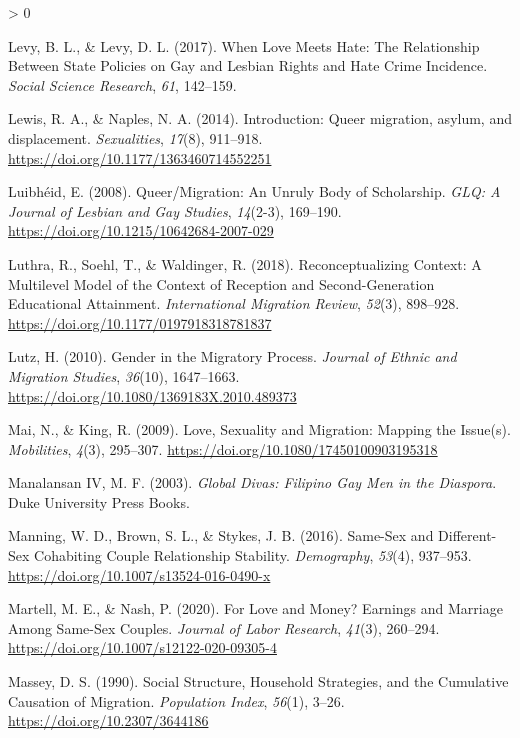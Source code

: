 \documentclass[
  12pt,
]{article}
\newlength{\cslhangindent}
\newenvironment{CSLReferences}[2] %
 {%
  \setlength{\parindent}{0pt}
  \ifodd #1 \everypar{\setlength{\hangindent}{\cslhangindent}}\ignorespaces\fi
  \ifnum #2 > 0
  \setlength{\parskip}{#2\baselineskip}
  \fi
 }%
 {}
\begin{document}
\begin{CSLReferences}{1}{0}
\leavevmode\hypertarget{ref-levy_2017}{}%
Levy, B. L., \& Levy, D. L. (2017). When {Love Meets Hate}: The {Relationship Between State Policies} on {Gay} and {Lesbian Rights} and {Hate Crime Incidence}. \emph{Social Science Research}, \emph{61}, 142--159.

\leavevmode\hypertarget{ref-lewis_2014}{}%
Lewis, R. A., \& Naples, N. A. (2014). Introduction: Queer migration, asylum, and displacement. \emph{Sexualities}, \emph{17}(8), 911--918. \url{https://doi.org/10.1177/1363460714552251}

\leavevmode\hypertarget{ref-luibheid_2008}{}%
Luibhéid, E. (2008). Queer/{Migration}: An {Unruly Body} of {Scholarship}. \emph{GLQ: A Journal of Lesbian and Gay Studies}, \emph{14}(2-3), 169--190. \url{https://doi.org/10.1215/10642684-2007-029}

\leavevmode\hypertarget{ref-luthra_2018}{}%
Luthra, R., Soehl, T., \& Waldinger, R. (2018). Reconceptualizing {Context}: A {Multilevel Model} of the {Context} of {Reception} and {Second}-{Generation Educational Attainment}. \emph{International Migration Review}, \emph{52}(3), 898--928. \url{https://doi.org/10.1177/0197918318781837}

\leavevmode\hypertarget{ref-lutz_2010}{}%
Lutz, H. (2010). Gender in the {Migratory Process}. \emph{Journal of Ethnic and Migration Studies}, \emph{36}(10), 1647--1663. \url{https://doi.org/10.1080/1369183X.2010.489373}

\leavevmode\hypertarget{ref-mai_2009}{}%
Mai, N., \& King, R. (2009). Love, {Sexuality} and {Migration}: Mapping the {Issue}(s). \emph{Mobilities}, \emph{4}(3), 295--307. \url{https://doi.org/10.1080/17450100903195318}

\leavevmode\hypertarget{ref-manalansaniv_2003}{}%
Manalansan IV, M. F. (2003). \emph{Global {Divas}: Filipino {Gay Men} in the {Diaspora}}. {Duke University Press Books}.

\leavevmode\hypertarget{ref-manning_2016}{}%
Manning, W. D., Brown, S. L., \& Stykes, J. B. (2016). Same-{Sex} and {Different}-{Sex Cohabiting Couple Relationship Stability}. \emph{Demography}, \emph{53}(4), 937--953. \url{https://doi.org/10.1007/s13524-016-0490-x}

\leavevmode\hypertarget{ref-martell_2020}{}%
Martell, M. E., \& Nash, P. (2020). For {Love} and {Money}? Earnings and {Marriage Among Same}-{Sex Couples}. \emph{Journal of Labor Research}, \emph{41}(3), 260--294. \url{https://doi.org/10.1007/s12122-020-09305-4}

\leavevmode\hypertarget{ref-massey_1990_social}{}%
Massey, D. S. (1990). Social {Structure}, {Household Strategies}, and the {Cumulative Causation} of {Migration}. \emph{Population Index}, \emph{56}(1), 3--26. \url{https://doi.org/10.2307/3644186}


\end{CSLReferences}
\end{document}

